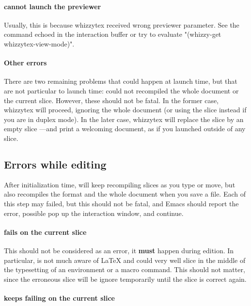 \documentclass[12pt]{article}
\begin{document}
\paragraph {{\whizzy} cannot launch the previewer}

Usually, this is because whizzytex received wrong previewer parameter.  See
the command echoed in the interaction buffer or try to evaluate
\lst"(whizzy-get whizzytex-view-mode)".

\paragraph {Other errors}

There are two remaining problems that could happen at launch time, but that
are not particular to launch time: {\whizzy} could not recompiled the whole 
document or the current slice. However, these should not be fatal. 
In the former case, whizzytex will proceed, ignoring the whole document 
(or using the slice instead if you are in duplex mode). In the later case,
whizzytex will replace the slice by an empty slice ---and print a welcoming
document, as if you launched {\whizzy} outside of any slice. 

\subsection {Errors while editing}

After initialization time, {\whizzy} will keep recompiling slices as you
type or move, but also recompiles the format and the whole document when you
save a file. Each of this step may failed, but this should not be fatal, and
Emacs should report the error, possible pop up the interaction window, and
continue. 

\paragraph {\whizzy\space fails on the current slice}

This should not be considered as an error, it {\bf must} happen during
edition. In particular, {\whizzy} is not much aware of {\LaTeX} and could
very well slice in the middle of the typesetting of an environment or a
macro command. This should not matter, since the erroneous slice will be
ignore temporarily until the slice is correct again.

\paragraph {\whizzy\space keeps failing on the current slice}
\end{document}
